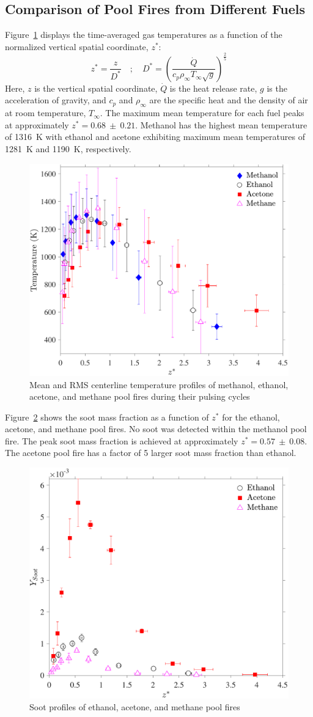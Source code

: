 \documentclass[preprint,review,12pt]{elsarticle}
\begin{document}
\subsection{Comparison of Pool Fires from Different Fuels}
\label{ssec:Fuel_comp}

Figure~\ref{fig:Temp_Comparison} displays the time-averaged gas temperatures as a function of the normalized vertical spatial coordinate, $z^*$:
\begin{equation}\label{eq:Z_Star}
z^*=\frac{z}{D^*}  \quad ; \quad  D^* = \left(\frac{\dot{Q}}{c_{p}\rho_\infty T_\infty \sqrt{g}}\right)^{\frac{2}{5}}
\end{equation}
Here, $z$ is the vertical spatial coordinate, $\dot{Q}$ is the heat release rate, $g$ is the acceleration of gravity, and $c_p$ and $\rho_\infty$ are the specific heat and the density of air at room temperature, $T_\infty$. The maximum mean temperature for each fuel peaks at approximately $z^*=0.68~\pm~0.21$. Methanol has the highest mean temperature of 1316~K with ethanol and acetone exhibiting maximum mean temperatures of 1281~K and 1190~K, respectively.

\begin{figure}[h!]
	\centering
\includegraphics[width=6.7 cm,keepaspectratio]{Temperature_Comparison.pdf}
	\caption[Mean and RMS centerline temperature profiles]{Mean and RMS centerline temperature profiles of methanol, ethanol, acetone, and methane pool fires during their pulsing cycles}
	\label{fig:Temp_Comparison}
\end{figure}
Figure~\ref{fig:Soot_Comparison} shows the soot mass fraction as a function of $z^*$ for the ethanol, acetone, and methane pool fires. No soot was detected within the methanol pool fire. The peak soot mass fraction is achieved at approximately $z^*=0.57~\pm~0.08$. The acetone pool fire has a factor of 5 larger soot mass fraction than ethanol. 
\begin{figure}[h!]
	\centering
\includegraphics[width=6.7 cm,keepaspectratio]{Soot.pdf}
	\caption[Soot Mass Fraction profiles]{Soot profiles of ethanol, acetone, and methane pool fires}
	\label{fig:Soot_Comparison}
\end{figure}
\end{document}
